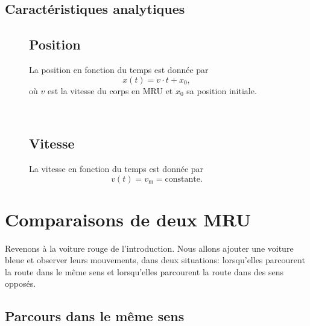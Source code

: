 \documentclass[
  letterpaper,
  DIV=11,
  numbers=noendperiod]{scrartcl}
\theoremstyle{definition}
\theoremstyle{definition}
\theoremstyle{remark}
\begin{document}
\begin{figure}
\end{figure}%

\subsection{Caractéristiques
analytiques}\label{caractuxe9ristiques-analytiques}

\begin{figure}

\begin{minipage}{0.48\linewidth}

\subsection{Position}\label{position-1}

La position en fonction du temps est donnée par \[
x(t)=v\cdot t+x_0,
\] où \(v\) est la vitesse du corps en MRU et \(x_0\) sa position
initiale.\end{minipage}%
%
\begin{minipage}{0.04\linewidth}
~\end{minipage}%
%
\begin{minipage}{0.48\linewidth}

\subsection{Vitesse}\label{vitesse-1}

La vitesse en fonction du temps est donnée par \[
v(t)=v_{\text{m}}=\text{constante}. 
\]\end{minipage}%

\end{figure}%

\newpage{}

\section{Comparaisons de deux MRU}\label{comparaisons-de-deux-mru}

Revenons à la voiture rouge de l'introduction. Nous allons ajouter une
voiture bleue et observer leurs mouvements, dans deux situations:
lorsqu'elles parcourent la route dans le même sens et lorsqu'elles
parcourent la route dans des sens opposés.

\subsection{Parcours dans le même
sens}\label{parcours-dans-le-muxeame-sens}
\end{document}
